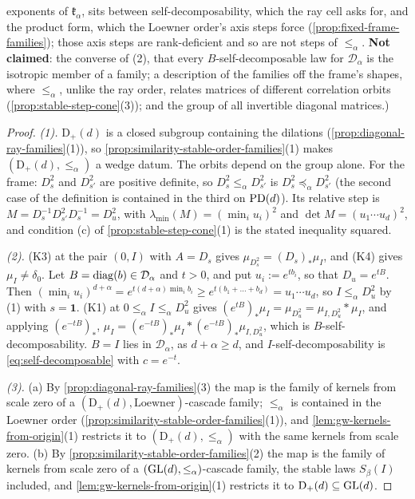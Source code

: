 \begin{proposition}
{exponents of $\mathfrak k_\alpha$, sits between self-decomposability, which the ray cell asks for, and the product form,
which the Loewner order's axis steps force (\ref{prop:fixed-frame-families}); those axis steps are
rank-deficient and so are not steps of $\le_\alpha$. \textbf{Not claimed}: the converse of (2), that every
$B$-self-decomposable law for $\mathcal D_\alpha$ is the isotropic member of a family; a description of the
families off the frame's shapes, where $\le_\alpha$, unlike the ray order, relates matrices of different
correlation orbits (\ref{prop:stable-step-cone}(3)); and the group of all invertible diagonal matrices.)}
\end{proposition}

\begin{proof}
\leanok
\emph{(1).} $\mathrm D_+(d)$ is a closed subgroup containing the dilations
(\ref{prop:diagonal-ray-families}(1)), so \ref{prop:similarity-stable-order-families}(1) makes
$(\mathrm D_+(d), \le_\alpha)$ a wedge datum. The orbits depend on the group alone. For the frame:
$D_s^2$ and $D_{s'}^2$ are positive definite, so $D_s^2 \le_\alpha D_{s'}^2$ is $D_s^2 \preceq_\alpha D_{s'}^2$
(the second case of the definition is contained in the third on $\mathrm{PD}(d)$). Its relative step is
$M = D_s^{-1}D_{s'}^2D_s^{-1} = D_u^2$, with $\lambda_{\min}(M) = (\min_iu_i)^2$ and $\det M = (u_1\cdots u_d)^2$,
and condition (c) of \ref{prop:stable-step-cone}(1) is the stated inequality squared.

\emph{(2).} (K3) at the pair $(0, I)$ with $A = D_s$ gives $\mu_{D_s^2} = (D_s)_*\mu_I$, and (K4) gives
$\mu_I \ne \delta_0$. Let $B = \operatorname{diag}(b) \in \mathcal D_\alpha$ and $t > 0$, and put $u_i := e^{tb_i}$, so that
$D_u = e^{tB}$. Then $(\min_iu_i)^{d+\alpha} = e^{t(d+\alpha)\min_ib_i} \ge e^{t(b_1 + \dots + b_d)} =
u_1\cdots u_d$, so $I \le_\alpha D_u^2$ by (1) with $s = \mathbf 1$. (K1) at $0 \le_\alpha I \le_\alpha D_u^2$
gives $(e^{tB})_*\mu_I = \mu_{D_u^2} = \mu_{I,D_u^2} * \mu_I$, and applying $(e^{-tB})_*$,
$\mu_I = (e^{-tB})_*\mu_I * (e^{-tB})_*\mu_{I,D_u^2}$, which is $B$-self-decomposability. $B = I$ lies in
$\mathcal D_\alpha$, as $d + \alpha \ge d$, and $I$-self-decomposability is \ref{eq:self-decomposable} with
$c = e^{-t}$.

\emph{(3).} (a) By \ref{prop:diagonal-ray-families}(3) the map is the family of kernels from scale zero of a
$(\mathrm D_+(d), \text{Loewner})$-cascade family; $\le_\alpha$ is contained in the Loewner order
(\ref{prop:similarity-stable-order-families}(1)), and \ref{lem:gw-kernels-from-origin}(1) restricts it to
$(\mathrm D_+(d), \le_\alpha)$ with the same kernels from scale zero. (b) By
\ref{prop:similarity-stable-order-families}(2) the map is the family of kernels from scale zero of a
$(\mathrm{GL}(d), \le_\alpha)$-cascade family, the stable laws $S_\beta(I)$ included, and
\ref{lem:gw-kernels-from-origin}(1) restricts it to $\mathrm D_+(d) \subseteq \mathrm{GL}(d)$.


\end{proof}
